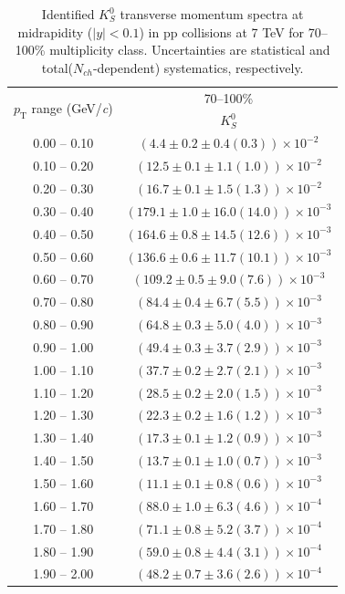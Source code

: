 \begin{table}
\caption{Identified $K^{0}_{S}$ transverse momentum spectra at midrapidity ($|y|<0.1$) in pp collisions at 7 TeV for 70--100\% multiplicity class. Uncertainties are statistical and total($N_{ch}$-dependent) systematics, respectively.}
\label{tab:K0Short_70to100}
\begin{center}
\begin{tabular}{ c | c }
\hline
\multirow{2}{*}{$p_{\mathrm{T}}$ range (GeV/\textit{c})} & \multicolumn{1}{c}{70--100\%} \\ & $K^{0}_{S}$\\ 
\hline
0.00 -- 0.10 & $(4.4\pm0.2\pm0.4(0.3))\times10^{-2}$ \\ 
0.10 -- 0.20 & $(12.5\pm0.1\pm1.1(1.0))\times10^{-2}$ \\ 
0.20 -- 0.30 & $(16.7\pm0.1\pm1.5(1.3))\times10^{-2}$ \\ 
0.30 -- 0.40 & $(179.1\pm1.0\pm16.0(14.0))\times10^{-3}$ \\ 
0.40 -- 0.50 & $(164.6\pm0.8\pm14.5(12.6))\times10^{-3}$ \\ 
0.50 -- 0.60 & $(136.6\pm0.6\pm11.7(10.1))\times10^{-3}$ \\ 
0.60 -- 0.70 & $(109.2\pm0.5\pm9.0(7.6))\times10^{-3}$ \\ 
0.70 -- 0.80 & $(84.4\pm0.4\pm6.7(5.5))\times10^{-3}$ \\ 
0.80 -- 0.90 & $(64.8\pm0.3\pm5.0(4.0))\times10^{-3}$ \\ 
0.90 -- 1.00 & $(49.4\pm0.3\pm3.7(2.9))\times10^{-3}$ \\ 
1.00 -- 1.10 & $(37.7\pm0.2\pm2.7(2.1))\times10^{-3}$ \\ 
1.10 -- 1.20 & $(28.5\pm0.2\pm2.0(1.5))\times10^{-3}$ \\ 
1.20 -- 1.30 & $(22.3\pm0.2\pm1.6(1.2))\times10^{-3}$ \\ 
1.30 -- 1.40 & $(17.3\pm0.1\pm1.2(0.9))\times10^{-3}$ \\ 
1.40 -- 1.50 & $(13.7\pm0.1\pm1.0(0.7))\times10^{-3}$ \\ 
1.50 -- 1.60 & $(11.1\pm0.1\pm0.8(0.6))\times10^{-3}$ \\ 
1.60 -- 1.70 & $(88.0\pm1.0\pm6.3(4.6))\times10^{-4}$ \\ 
1.70 -- 1.80 & $(71.1\pm0.8\pm5.2(3.7))\times10^{-4}$ \\ 
1.80 -- 1.90 & $(59.0\pm0.8\pm4.4(3.1))\times10^{-4}$ \\ 
1.90 -- 2.00 & $(48.2\pm0.7\pm3.6(2.6))\times10^{-4}$ \\ 

\end{tabular}
\end{center}
\end{table}
